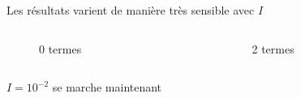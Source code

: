 \documentclass[10pt]{beamer}
\begin{document}
\begin{frame}{Les résultats varient de manière très sensible avec $I$}
    \begin{columns}
        \begin{column}{0.5\textwidth}
            \begin{figure}[h]
                \centering
                \scalebox{0.5}{}
                \caption{0 termes}
            \end{figure}
        \end{column}
        \begin{column}{0.5\textwidth}
            \begin{figure}[h]
                \centering
                \scalebox{0.5}{}
                \caption{2 termes}
            \end{figure}
        \end{column}
    \end{columns}
    $I = 10^{-2}$ se marche maintenant
\end{frame}



\end{document}

